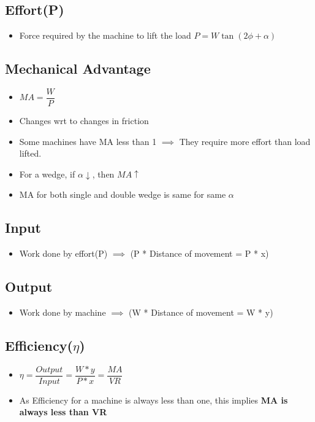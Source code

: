 \documentclass[8pt]{report}
\begin{document}
\subsection{Effort(P)}
	\begin{itemize}
		\item Force required by the machine to lift the load $\boxed{P = W\tan(2\phi+\alpha)}$
	\end{itemize}
\subsection{Mechanical Advantage}
	\begin{itemize}
		\item $\boxed{MA = \dfrac{W}{P}}$
		\item Changes wrt to changes in friction
		\item Some machines have MA less than 1 $\implies$ They require more effort than load lifted.
		\item For a wedge, if $\alpha\downarrow$, then $MA\uparrow$ 
		\item MA for both single and double wedge is same for same $\alpha$
	\end{itemize}
\subsection{Input}
	\begin{itemize}
		\item Work done by effort(P) $\implies$ (P * Distance of movement = P * x)
	\end{itemize}
\subsection{Output}
	\begin{itemize}
		\item Work done by machine $\implies$ (W * Distance of movement = W * y)
	\end{itemize}
\subsection{Efficiency($\eta$)}
	\begin{itemize}
		\item $\boxed{\eta=\dfrac{Output}{Input} = \dfrac{W*y}{P*x} = \dfrac{MA}{VR}}$
		\item As Efficiency for a machine is always less than one, this implies \textbf{MA is always less than VR}
	\end{itemize}
\end{document}
